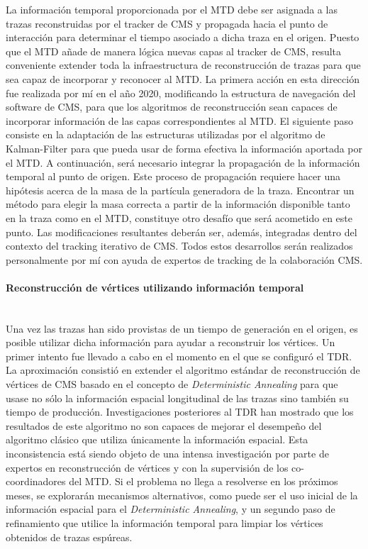 La información temporal proporcionada por el MTD debe ser asignada a las trazas reconstruidas por el tracker de CMS y propagada hacia el punto de interacción para determinar el tiempo asociado a dicha traza en el origen. Puesto que el MTD añade de manera lógica nuevas capas al tracker de CMS, resulta conveniente extender toda la infraestructura de reconstrucción de trazas para que sea capaz de incorporar y reconocer al MTD. La primera acción en esta dirección fue realizada por mí en el año 2020, modificando la estructura de navegación del software de CMS, para que los algoritmos de reconstrucción sean capaces de incorporar información de las capas correspondientes al MTD. El siguiente paso consiste en la adaptación de las estructuras utilizadas por el algoritmo de Kalman-Filter para que pueda usar de forma efectiva la información aportada por el MTD. A continuación, será necesario integrar la propagación de la información temporal al punto de origen. Este proceso de propagación requiere hacer una hipótesis acerca de la masa de la partícula generadora de la traza. Encontrar un método para elegir la masa correcta a partir de la información disponible tanto en la traza como en el MTD, constituye otro desafío que será acometido en este punto. Las modificaciones resultantes deberán ser, además, integradas dentro del contexto del tracking iterativo de CMS. Todos estos desarrollos serán realizados personalmente por mí con ayuda de expertos de tracking de la colaboración CMS. 

\paragraph{Reconstrucción de vértices utilizando información temporal\\\\}

Una vez las trazas han sido provistas de un tiempo de generación en el origen, es posible utilizar dicha información para ayudar a reconstruir los vértices. Un primer intento fue llevado a cabo en el momento en el que se configuró el TDR. La aproximación consistió en extender el algoritmo estándar de reconstrucción de vértices de CMS basado en el concepto de \emph{Deterministic Annealing} para que usase no sólo la información espacial longitudinal de las trazas sino también su tiempo de producción. Investigaciones posteriores al TDR han mostrado que los resultados de este algoritmo no son capaces de mejorar el desempeño del algoritmo clásico que utiliza únicamente la información espacial. Esta inconsistencia está siendo objeto de una intensa investigación por parte de expertos en reconstrucción de vértices y con la supervisión de los co-coordinadores del MTD. Si el problema no llega a resolverse en los próximos meses, se explorarán mecanismos alternativos, como puede ser el uso inicial de la información espacial para el \emph{Deterministic Annealing}, y un segundo paso de refinamiento que utilice la información temporal para limpiar los vértices obtenidos de trazas espúreas. 

